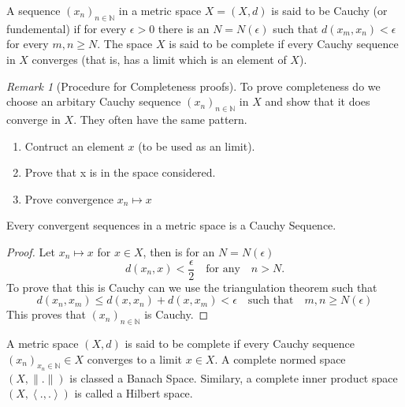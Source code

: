 \documentclass{article}
\theoremstyle{remark}
\newtheorem*{remark}{Remark}
\begin{document}
\begin{definition}[Completeness]
  A sequence $\left( x_{n} \right)_{n \in \mathbb{N}}$ in a metric space $X=\left( X,d \right)$ is said to be Cauchy (or fundemental) if for every $\epsilon> 0$ there is an $N = N\left( \epsilon \right)$ such that $d\left( x_{m}, x_{n} \right) < \epsilon$  for every $m,n \ge N$. The space $X$ is said to be complete if every Cauchy sequence in $X$ converges (that is, has a limit which is an element of $X$). 
\end{definition}

\begin{remark}[Procedure for Completeness proofs]
  
  To prove completeness do we choose an arbitary Cauchy sequence $\left( x_n \right)_{n \in \mathbb{N}}$ in $X$ and show that it does converge in $X$. They often have the same pattern.

  \begin{enumerate}
    \item Contruct an element $x$ (to be used as an limit).
    \item Prove that x is in the space considered.
    \item Prove convergence $x_{n} \mapsto x$
  \end{enumerate}
\end{remark}

\begin{theorem}
  Every convergent sequences in a metric space is a Cauchy Sequence.
\end{theorem}
\begin{proof}
  Let $x_{n} \mapsto x$ for $x \in X$, then is for an $N = N\left( \epsilon \right)$\[
  d\left( x_{n},x \right) < \frac{\epsilon}{2} \quad \text{for any} \quad  n > N 
  .\] 
  To prove that this is Cauchy can we use the triangulation theorem such that \[
  d\left( x_{n}, x_{m} \right) \le d\left( x,x_{n} \right) + d\left( x, x_{m} \right) < \epsilon \quad \text{such that} \quad m,n \ge N\left( \epsilon \right)
  \]  
  This proves that $\left( x_{n} \right)_{n \in \mathbb{N}} $ is Cauchy.
  
\end{proof}

\begin{definition}
  A metric space $\left( X,d \right) $ is said to be complete if every Cauchy sequence $\left( x_n \right) _{x_{n}\in\mathbb{N}} \in X$ converges to a limit $x \in X$. A complete normed space $\left( X,\|.\| \right) $ is classed a Banach Space. Similary, a complete inner product space $\left( X, \left<.,. \right> \right) $ is called a Hilbert space. 
\end{definition}
\end{document}
